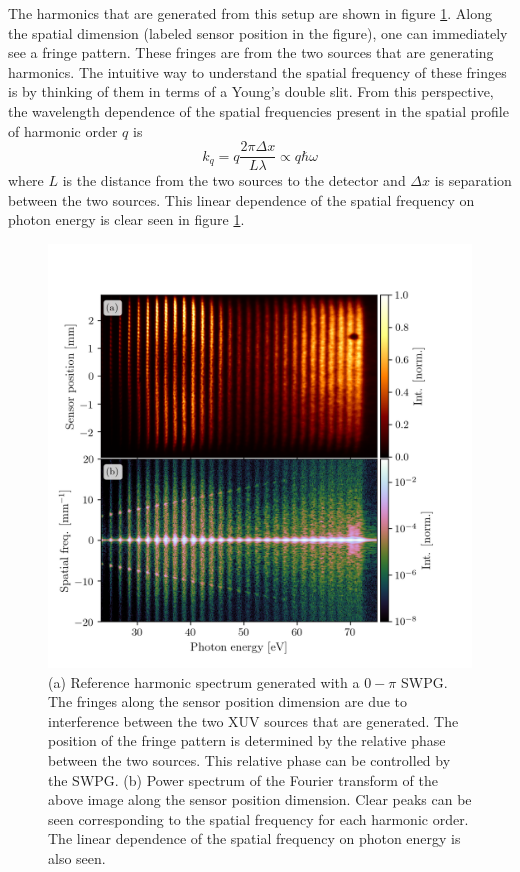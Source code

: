 The harmonics that are generated from this setup are shown in figure \ref{fig:ref_img_pow_spec}. Along the spatial dimension (labeled sensor position in the figure), one can immediately see a fringe pattern.  These fringes are from the two sources that are generating harmonics.  The intuitive way to understand the spatial frequency of these fringes is by thinking of them in terms of a Young's double slit.  From this perspective, the wavelength dependence of the spatial frequencies present in the spatial profile of harmonic order $q$ is
\begin{equation}
	k_q=q\frac{2\pi \Delta x}{L \lambda}\propto q\hbar\omega
\end{equation} 
where $L$ is the distance from the two sources to the detector and $\Delta x$ is separation between the two sources.  This linear dependence of the spatial frequency on photon energy is clear seen in figure \ref{fig:ref_img_pow_spec}.
\begin{figure}
	\centering
	\includegraphics[width=1.0\textwidth]{figures/Two_source/ref_img_pow_spec.png}
	\caption{(a) Reference harmonic spectrum generated with a $0-\pi$ SWPG. The fringes along the sensor position dimension are due to interference between the two XUV sources that are generated.  The position of the fringe pattern is determined by the relative phase between the two sources.  This relative phase can be controlled by the SWPG. (b) Power spectrum of the Fourier transform of the above image along the sensor position dimension. Clear peaks can be seen corresponding to the spatial frequency for each harmonic order.  The linear dependence of the spatial frequency on photon energy is also seen.}
	\label{fig:ref_img_pow_spec}
\end{figure}

